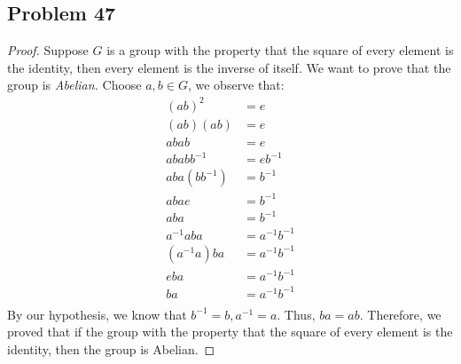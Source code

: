 \documentclass[a4paper,12pt]{article}
\begin{document}
\subsection*{Problem 47}
\begin{proof}
    Suppose $G$ is a group with the property that the square of every element is the identity, then every element is the inverse of itself. We want to prove that the group is \textit{Abelian.} Choose $a,b \in G$, we observe that:
    \begin{align*}
        (ab)^2&=e \\
        (ab)(ab)&=e\\
        abab&=e\\
        ababb^{-1}&=eb^{-1}\\
        aba(bb^{-1})&=b^{-1}\\
        abae&=b^{-1}\\
        aba&=b^{-1}\\
        a^{-1}aba&=a^{-1}b^{-1}\\
        (a^{-1}a)ba&=a^{-1}b^{-1}\\
        eba&=a^{-1}b^{-1} \\
         ba&=a^{-1}b^{-1}\\
    \end{align*}
    By our hypothesis, we know that $b^{-1}=b, a^{-1}=a$. Thus, $ba=ab$. Therefore, we proved that if the group with the property that the square of every element is the identity, then the group is Abelian.
\end{proof}
\end{document}
